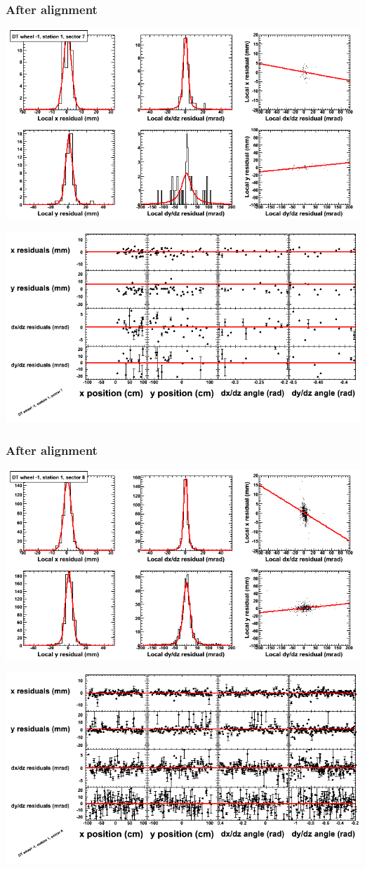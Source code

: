 \documentclass[compress]{beamer}
\begin{document}
\begin{frame}
\frametitle{After alignment}
\includegraphics[width=0.7\linewidth]{NOV4_fitfunctions/MBwhBst1sec07_bellcurves.png}

\includegraphics[width=0.7\linewidth]{NOV4_fitfunctions/MBwhBst1sec07_polynomials.png}
\end{frame}

\begin{frame}
\frametitle{After alignment}
\includegraphics[width=0.7\linewidth]{NOV4_fitfunctions/MBwhBst1sec08_bellcurves.png}

\includegraphics[width=0.7\linewidth]{NOV4_fitfunctions/MBwhBst1sec08_polynomials.png}
\end{frame}
\end{document}
